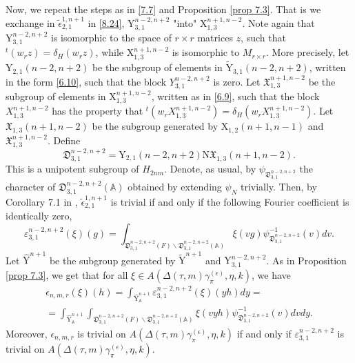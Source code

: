 \documentclass[12pts]{amsart}
\newcommand{\BA}{{\mathbb {A}}}
\begin{document}
Now, we repeat the steps as in \eqref{7.7} and Proposition \ref{prop
	7.3}. That is we exchange in $\widetilde{\epsilon}_{2,1}^{1,n+1}$ in
\eqref{8.24}, $\mathrm{Y}_{3,1}^{n-2,n+2}$ "into"
$\mathrm{X}_{1,3}^{n+1,n-2}$. Note again that
$\mathrm{Y}_{3,1}^{n-2,n+2}$ is isomorphic to the space of $r\times r$
matrices $z$, such that ${}^t(w_rz)=\delta_H(w_rz)$, while $\mathrm{X}_{1,3}^{n+1,n-2}$ is
isomorphic to $M_{r\times r}$. More precisely, let
$\mathrm{Y}_{2,1}(n-2,n+2)$ be the subgroup of elements in
$\widetilde{\mathrm{Y}}_{3,1}(n-2,n+2)$, written in the form
\eqref{6.10}, such that the block $Y_{3,1}^{n-2,n+2}$ is zero. Let
$\mathfrak{X}_{1,3}^{n+1,n-2}$ be the subgroup of elements in
$\mathrm{X}_{1,3}^{n+1,n-2}$, written as in \eqref{6.9}, such that
the block $X_{1,3}^{n+1,n-2}$ has the property that $ {}^t(w_r
X_{1,3}^{n+1,n-2})=\delta_H(w_rX_{1,3}^{n+1,n-2})$. Let
$\mathfrak{X}_{1,3}(n+1,n-2)$ be the subgroup generated by
$\mathrm{X}_{1,2}(n+1,n-1)$ and $\mathfrak{X}_{1,3}^{n+1,n-2}$.
Define
\begin{equation}\label{8.26}
\mathfrak{D}_{3,1}^{n-2,n+2}=\mathrm{Y}_{2,1}(n-2,n+2)\mathrm{N}\mathfrak{X}_{1,3}(n+1,n-2).
\end{equation}
This is a unipotent subgroup of $H_{2nm}$. Denote, as usual,
by $\psi_{\mathfrak{D}_{3,1}^{n-2,n+2}}$ the character of
$\mathfrak{D}_{3,1}^{n-2,n+2}(\BA)$ obtained by extending
$\psi_N$ trivially. Then, by Corollary 7.1 in \cite{GRS11},
$\widetilde{\epsilon}_{2,1}^{1,n+1}$ is trivial if and only if the
following Fourier coefficient is identically zero,
\begin{equation}\label{8.27}
\varepsilon_{3,1}^{n-2,n+2}(\xi)(g)=\int_{\mathfrak{D}_{3,1}^{n-2,n+2}(F)\backslash
	\mathfrak{D}_{3,1}^{n-2,n+2}(\BA)}\xi(vg)\psi_{\mathfrak{D}_{3,1}^{n-2,n+2}}^{-1}(v)dv.
\end{equation}
Let $\hat{\mathrm{Y}}^{n+1}$ be the subgroup generated by $\widetilde{\mathrm{Y}}^{n+1}$ and $\mathrm{Y}_{3,1}^{n-2,n+2}$. As in Proposition \ref{prop 7.3}, we get that for all $\xi\in A(\Delta(\tau,m)\gamma_\pi^{(\epsilon)},\eta,k)$, we have
	\begin{multline}\label{8.27.1}
	\epsilon_{n,m,r}(\xi)(h)=\int_{\hat{\mathrm{Y}}^{n+1}_\BA}\varepsilon_{3,1}^{n-2,n+2}(\xi)(yh)dy
	=\\
	=\int_{\hat{\mathrm{Y}}^{n+1}_\BA}\int_{\mathfrak{D}_{3,1}^{n-2,n+2}(F)\backslash \mathfrak{D}_{3,1}^{n-2,n+2}(\BA)}\xi(vyh)\psi^{-1}_{\mathfrak{D}_{3,1}^{n-2,n+2}}(v)dvdy.
	\end{multline}
	Moreover, $\epsilon_{n,m,r}$ is trivial on 	$A(\Delta(\tau,m)\gamma_\pi^{(\epsilon)},\eta,k)$ if and only if 
	$\varepsilon_{3,1}^{n-2,n+2}$ is trivial on $A(\Delta(\tau,m)\gamma_\pi^{(\epsilon)},\eta,k)$. 
\end{document}
